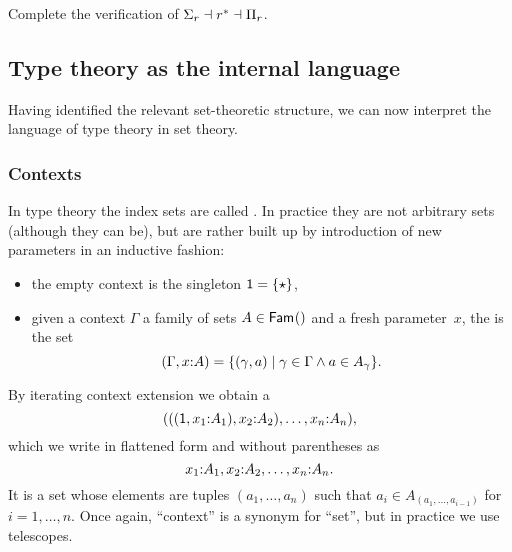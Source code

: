 \begin{exercise}
  Complete the verification of $\Sigma_r \dashv r^{*} \dashv \Pi_r$.
\end{exercise}

\subsection{Type theory as the internal language}
\label{sec:interpr-type-theory}

Having identified the relevant set-theoretic structure, we can now interpret the language of type theory in set theory.

\subsubsection{Contexts}
\label{sec:contexts}

In type theory the index sets are called . In practice they are not arbitrary sets (although they can be), but are rather built up by introduction of new parameters in an inductive fashion:
\begin{itemize}
\item the empty context is the singleton $\mathsf{1} = \{\star\}$,
\item given a context $\Gamma$ a family of sets $A \in \mathsf{Fam}_{}()$ and a fresh parameter~$x$, the  is the set
  \begin{equation*}
    (\Gamma, x {:} A) = \{ (\gamma, a) \mid \gamma \in \Gamma \land a \in A_\gamma \}.
  \end{equation*}
\end{itemize}
%
By iterating context extension we obtain a 
%
\begin{equation*}
  (((\mathsf{1}, x_1 {:} A_1), x_2 {:} A_2), \ldots, x_n {:} A_n),
\end{equation*}
%
which we write in flattened form and without parentheses as
%
\begin{equation*}
  x_1 {:} A_1, x_2 {:} A_2, \ldots, x_n {:} A_n.
\end{equation*}
%
It is a set whose elements are tuples $(a_1, \ldots, a_n)$ such that $a_i \in A_{(a_1, \ldots, a_{i-1})}$ for $i = 1, \ldots, n$.
%
Once again, ``context'' is a synonym for ``set'', but in practice we use telescopes.

